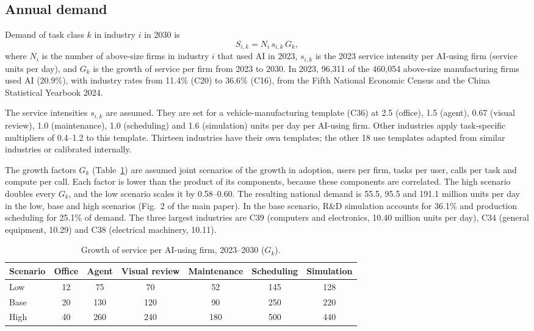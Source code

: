 \documentclass[11pt]{article}
\begin{document}
\subsection*{Annual demand}
Demand of task class $k$ in industry $i$ in 2030 is
\begin{equation}
S_{i,k}=N_i\,s_{i,k}\,G_k,\label{eq:demand}
\end{equation}
where $N_i$ is the number of above-size firms in industry $i$ that used AI in 2023, $s_{i,k}$ is the 2023 service intensity per AI-using firm (service units per day), and $G_k$ is the growth of service per firm from 2023 to 2030. In 2023, 96,311 of the 460,054 above-size manufacturing firms used AI (20.9\%), with industry rates from 11.4\% (C20) to 36.6\% (C16), from the Fifth National Economic Census and the China Statistical Yearbook 2024.

The service intensities $s_{i,k}$ are assumed. They are set for a vehicle-manufacturing template (C36) at 2.5 (office), 1.5 (agent), 0.67 (visual review), 1.0 (maintenance), 1.0 (scheduling) and 1.6 (simulation) units per day per AI-using firm. Other industries apply task-specific multipliers of 0.4--1.2 to this template. Thirteen industries have their own templates; the other 18 use templates adapted from similar industries or calibrated internally.

The growth factors $G_k$ (Table~\ref{tab:growth}) are assumed joint scenarios of the growth in adoption, users per firm, tasks per user, calls per task and compute per call. Each factor is lower than the product of its components, because these components are correlated. The high scenario doubles every $G_k$, and the low scenario scales it by 0.58--0.60. The resulting national demand is 55.5, 95.5 and 191.1 million units per day in the low, base and high scenarios (Fig.~2 of the main paper). In the base scenario, R\&D simulation accounts for 36.1\% and production scheduling for 25.1\% of demand. The three largest industries are C39 (computers and electronics, 10.40 million units per day), C34 (general equipment, 10.29) and C38 (electrical machinery, 10.11).

\begin{table}[H]
\centering\small
\caption{Growth of service per AI-using firm, 2023--2030 ($G_k$).}\label{tab:growth}
\begin{tabular}{@{}lcccccc@{}}
\toprule
Scenario & Office & Agent & Visual review & Maintenance & Scheduling & Simulation \\
\midrule
Low & 12 & 75 & 70 & 52 & 145 & 128 \\
Base & 20 & 130 & 120 & 90 & 250 & 220 \\
High & 40 & 260 & 240 & 180 & 500 & 440 \\
\bottomrule
\end{tabular}
\end{table}
\end{document}
